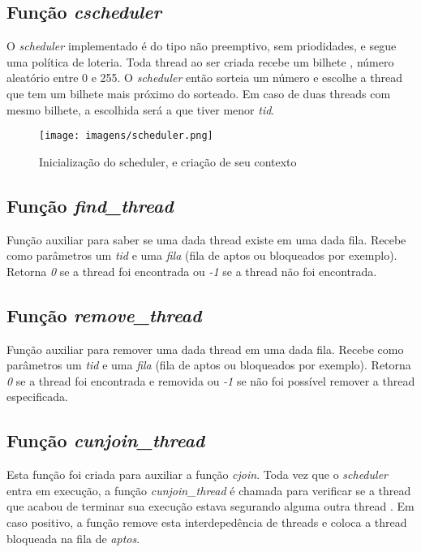 \documentclass{article}
\begin{document}
\subsection{Função \textit{cscheduler}}
O \textit{scheduler} implementado é do tipo não preemptivo, sem priodidades, e segue uma política de loteria. Toda thread ao ser criada recebe um bilhete \footnotemark, número aleatório entre 0 e 255. O \textit{scheduler} então sorteia um número e escolhe a thread que tem um bilhete mais próximo do sorteado. Em caso de duas threads com mesmo bilhete, a escolhida será a  que tiver menor \textit{tid}.

\begin{figure}[h]
    \centering
    \texttt{[image: imagens/scheduler.png]}
    \caption{Inicialização do scheduler, e criação de seu contexto}
    \label{fig:sym4}
\end{figure}

\subsection{Função \textit{find\_thread}}
Função auxiliar para saber se uma dada thread existe em uma dada fila. Recebe como parâmetros um \textit{tid} e uma \textit{fila} (fila de aptos ou bloqueados por exemplo). Retorna \textit{0} se a thread foi encontrada ou \textit{-1} se a thread não foi encontrada.

\subsection{Função \textit{remove\_thread}}
Função auxiliar para remover uma dada thread em uma dada fila. Recebe como parâmetros um \textit{tid} e uma \textit{fila} (fila de aptos ou bloqueados por exemplo). Retorna \textit{0} se a thread foi encontrada e removida ou \textit{-1} se não foi possível remover a thread especificada.

\subsection{Função \textit{cunjoin\_thread}}
Esta função foi criada para auxiliar a função \textit{cjoin}. Toda vez que o \textit{scheduler} entra em execução, a função \textit{cunjoin\_thread} é chamada para verificar se a thread que acabou de terminar sua execução estava segurando alguma outra thread \footnotemark. Em caso positivo, a função remove esta interdepedência de threads e coloca a thread bloqueada na fila de \textit{aptos}.
\end{document}
